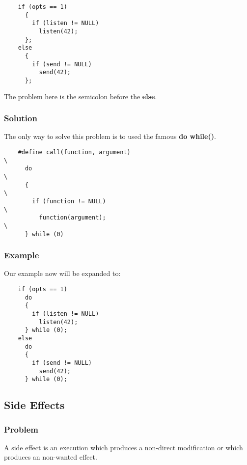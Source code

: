 {\begin{frame}[containsverbatim]
  \begin{verbatim}
    if (opts == 1)
      {
        if (listen != NULL)
          listen(42);
      };
    else
      {
        if (send != NULL)
          send(42);
      };
  \end{verbatim}

  The problem here is the semicolon before the \textbf{else}.
\end{frame}


\begin{frame}[containsverbatim]
  \frametitle{Solution}

  The only way to solve this problem is to used the famous
  \textbf{do while()}.

  \begin{verbatim}
    #define call(function, argument)                                    \
      do                                                                \
      {                                                                 \
        if (function != NULL)                                           \
          function(argument);                                           \
      } while (0)
  \end{verbatim}
\end{frame}


\begin{frame}[containsverbatim]
  \frametitle{Example}

  Our example now will be expanded to:

  \begin{verbatim}
    if (opts == 1)
      do
      {
        if (listen != NULL)
          listen(42);
      } while (0);
    else
      do
      {
        if (send != NULL)
          send(42);
      } while (0);
  \end{verbatim}
\end{frame}

%
%

\subsection{Side Effects}


\begin{frame}[containsverbatim]
  \frametitle{Problem}

  A side effect is an execution which produces a non-direct modification
  or which produces an non-wanted effect.


\end{frame}}
